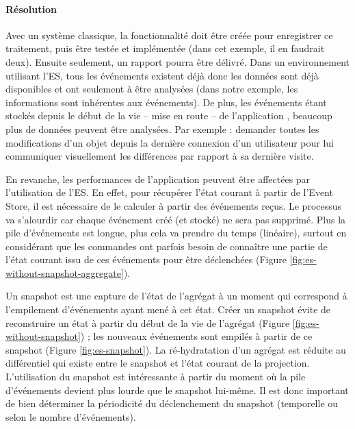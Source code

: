 \paragraph{Résolution} Avec un système classique, la fonctionnalité doit être 
créée pour enregistrer ce traitement, puis être testée et implémentée (dans cet 
exemple, il en faudrait deux). Ensuite seulement, un rapport pourra être délivré. 
Dans un environnement utilisant l'\gls{ES}, tous les événements existent déjà 
donc les données sont déjà disponibles et ont seulement à être analysées 
(dans notre exemple, les informations sont inhérentes aux événements). De plus, 
les événements étant stockés depuis le début de la vie -- mise en route -- de l'application , beaucoup plus de données peuvent être analysées. Par 
exemple : demander toutes les modifications d'un objet depuis la dernière 
connexion d'un utilisateur pour lui communiquer visuellement les différences par 
rapport à sa dernière visite.



En revanche, les performances de l'application peuvent être affectées par 
l'utilisation de 
l'\gls{ES}. En effet, pour récupérer l'état courant à partir de l'Event Store, il est 
nécessaire de le calculer à partir des événements reçus.
Le processus  va s'alourdir car chaque événement créé (et stocké) ne sera pas supprimé. Plus la pile d'événements est longue, plus cela va prendre 
du temps (linéaire), surtout en considérant que les commandes ont parfois besoin 
de connaître une partie de l'état courant issu de ces événements pour être 
déclenchées (Figure \ref{fig:es-without-snapshot-aggregate}).
 
Un \gls{snapshot} est une capture de l'état de l'agrégat à un 
moment qui correspond à l'empilement d'événements ayant mené à cet état. Créer 
un \gls{snapshot} évite de reconstruire un état à partir du début de la 
vie de l'agrégat (Figure \ref{fig:es-without-snapshot}) ; les nouveaux 
événements sont empilés à partir de ce snapshot (Figure \ref{fig:es-snapshot}). La 
ré-hydratation d'un agrégat est réduite au différentiel qui existe entre le snapshot et 
l'état courant de la projection. 
L'utilisation du \gls{snapshot} est intéressante à partir du moment où la pile 
d'événements devient plus lourde que le \gls{snapshot} lui-même.
Il est donc important de bien déterminer la périodicité du déclenchement du 
\gls{snapshot} (temporelle ou selon le nombre d'événements).


